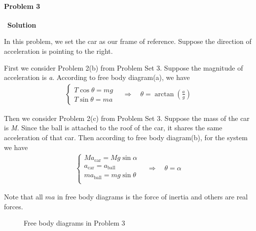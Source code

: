 \documentclass[12pt,a4paper]{article}
\begin{document}
\paragraph{\large \textbf{Problem 3}}~{\textbf{Solution}}
\vspace{2mm}
\par In this problem, we set the car as our frame of reference. Suppose the direction of acceleration is pointing to the right.
\par First we consider Problem 2(b) from Problem Set 3. Suppose the magnitude of acceleration is \textit{a}. According to free body diagram(a), we have
\begin{align*}
	\left\{ \begin{array}{l}
		T\cos\theta = mg\\
		T\sin\theta = ma	
	\end{array} \right.
	\quad \Rightarrow \quad
	\theta = \arctan(\frac{a}{g})
\end{align*}
\par Then we consider Problem 2(c) from Problem Set 3. Suppose the mass of the car is \textit{M}. Since the ball is attached to the roof of the car, it shares the same acceleration of that car. Then according to free body diagram(b), for the system we have
\begin{align*}
	\left\{ \begin{array}{l}
		Ma_{\text{car}} = Mg\sin\alpha\\
		a_{\text{car}} = a_{\text{ball}}\\
		ma_{\text{ball}} = mg\sin\theta\\			
	\end{array} \right.	
	\quad \Rightarrow \quad
	\theta = \alpha
\end{align*}
\par Note that all $ma$ in free body diagrams is the force of inertia and others are real forces.
\begin{figure}[H]
    \centering
    \caption{Free body diagrams in Problem 3}
\end{figure}
\end{document}
